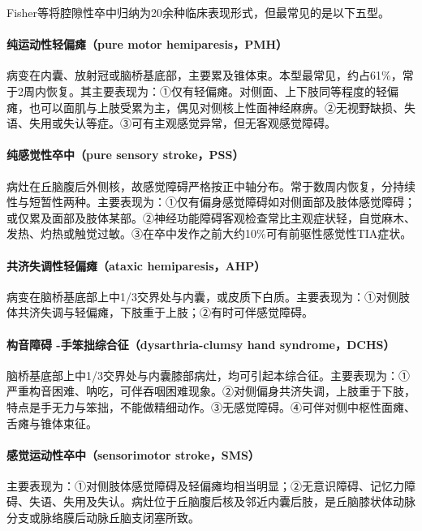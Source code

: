 Fisher等将腔隙性卒中归纳为20余种临床表现形式，但最常见的是以下五型。

\paragraph{纯运动性轻偏瘫（pure motor hemiparesis，PMH）}

病变在内囊、放射冠或脑桥基底部，主要累及锥体束。本型最常见，约占61\%，常于2周内恢复。其主要表现为：①仅有轻偏瘫。对侧面、上下肢同等程度的轻偏瘫，也可以面肌与上肢受累为主，偶见对侧核上性面神经麻痹。②无视野缺损、失语、失用或失认等症。③可有主观感觉异常，但无客观感觉障碍。

\paragraph{纯感觉性卒中（pure sensory stroke，PSS）}

病灶在丘脑腹后外侧核，故感觉障碍严格按正中轴分布。常于数周内恢复，分持续性与短暂性两种。主要表现为：①仅有偏身感觉障碍如对侧面部及肢体感觉障碍；或仅累及面部及肢体某部。②神经功能障碍客观检查常比主观症状轻，自觉麻木、发热、灼热或触觉过敏。③在卒中发作之前大约10\%可有前驱性感觉性TIA症状。

\paragraph{共济失调性轻偏瘫（ataxic hemiparesis，AHP）}

病变在脑桥基底部上中1/3交界处与内囊，或皮质下白质。主要表现为：①对侧肢体共济失调与轻偏瘫，下肢重于上肢；②有时可伴感觉障碍。

\paragraph{构音障碍 -手笨拙综合征（dysarthria-clumsy hand syndrome，DCHS）}

脑桥基底部上中1/3交界处与内囊膝部病灶，均可引起本综合征。主要表现为：①严重构音困难、呐吃，可伴吞咽困难现象。②对侧偏身共济失调，上肢重于下肢，特点是手无力与笨拙，不能做精细动作。③无感觉障碍。④可伴对侧中枢性面瘫、舌瘫与锥体束征。

\paragraph{感觉运动性卒中（sensorimotor stroke，SMS）}

主要表现为：①对侧肢体感觉障碍及轻偏瘫均相当明显；②无意识障碍、记忆力障碍、失语、失用及失认。病灶位于丘脑腹后核及邻近内囊后肢，是丘脑膝状体动脉分支或脉络膜后动脉丘脑支闭塞所致。

